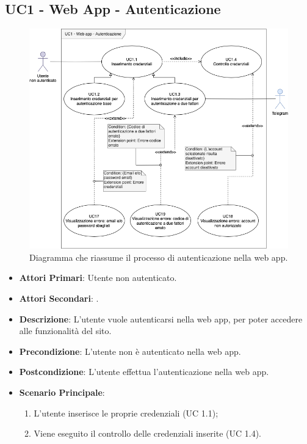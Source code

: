 	\subsection{UC1 - Web App - Autenticazione}
		
	\begin{figure}[H]
		\centering
		\includegraphics[scale=0.60]{res/images/uc1}
		\caption{Diagramma che riassume il processo di autenticazione nella web app.}
	\end{figure}
		
	\begin{itemize}
		\item \textbf{Attori Primari}: Utente non autenticato.
		\item \textbf{Attori Secondari}: .
		\item \textbf{Descrizione}: L'utente vuole autenticarsi nella web app, per poter accedere alle funzionalità del sito.
		\item \textbf{Precondizione}: L'utente non è autenticato nella web app.
		\item \textbf{Postcondizione}: L'utente effettua l'autenticazione nella web app.
		\item \textbf{Scenario Principale}:
		\begin{enumerate}
			\item L'utente inserisce le proprie credenziali (UC 1.1);
			\item Viene eseguito il controllo delle credenziali inserite (UC 1.4).
		\end{enumerate}
	\end{itemize}
	

